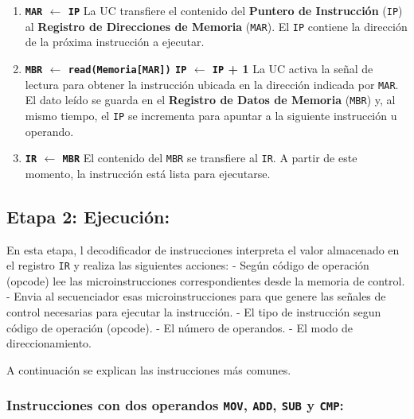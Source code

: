\documentclass[12pt,oneside]{templates/unerthesis}
\begin{document}
\begin{enumerate}
\def\labelenumi{\arabic{enumi}.}
\item
  \textbf{\texttt{MAR} \(\leftarrow\) \texttt{IP}}
  La UC transfiere el contenido del \textbf{Puntero de Instrucción} (\texttt{IP}) al \textbf{Registro de Direcciones de Memoria} (\texttt{MAR}). El \texttt{IP} contiene la dirección de la próxima instrucción a ejecutar.
\item
  \textbf{\texttt{MBR} \(\leftarrow\) \texttt{read(Memoria{[}MAR{]})} \textbar{} \texttt{IP} \(\leftarrow\) \texttt{IP} + 1}
  La UC activa la señal de lectura para obtener la instrucción ubicada en la dirección indicada por \texttt{MAR}. El dato leído se guarda en el \textbf{Registro de Datos de Memoria} (\texttt{MBR}) y, al mismo tiempo, el \texttt{IP} se incrementa para apuntar a la siguiente instrucción u operando.
\item
  \textbf{\texttt{IR} \(\leftarrow\) \texttt{MBR}}
  El contenido del \texttt{MBR} se transfiere al \texttt{IR}. A partir de este momento, la instrucción está lista para ejecutarse.
\end{enumerate}

\hypertarget{etapa-2-ejecuciuxf3n}{%
\subsection{Etapa 2: Ejecución:}\label{etapa-2-ejecuciuxf3n}}

En esta etapa, l decodificador de instrucciones interpreta el valor almacenado en el registro \texttt{IR} y realiza las siguientes acciones:
- Según código de operación (opcode) lee las microinstrucciones correspondientes desde la memoria de control.
- Envia al secuenciador esas microinstrucciones para que genere las señales de control necesarias para ejecutar la instrucción.
- El tipo de instrucción segun código de operación (opcode).
- El número de operandos.
- El modo de direccionamiento.

A continuación se explican las instrucciones más comunes.

\hypertarget{instrucciones-con-dos-operandos-mov-add-sub-y-cmp}{%
\subsubsection{\texorpdfstring{Instrucciones con dos operandos \texttt{MOV}, \texttt{ADD}, \texttt{SUB} y \texttt{CMP}:}{Instrucciones con dos operandos MOV, ADD, SUB y CMP:}}\label{instrucciones-con-dos-operandos-mov-add-sub-y-cmp}}
\end{document}
